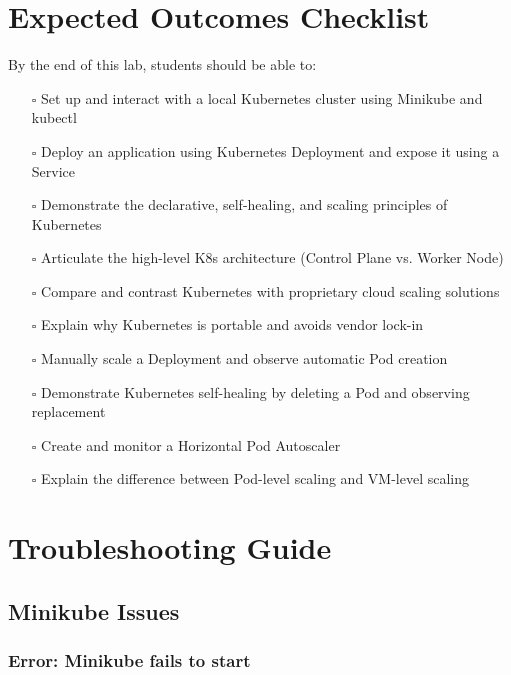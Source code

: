 \documentclass[12pt,a4paper]{article}
\begin{document}
\section{Expected Outcomes Checklist}

By the end of this lab, students should be able to:

\begin{itemize}
    \item[$\square$] Set up and interact with a local Kubernetes cluster using Minikube and kubectl
    \item[$\square$] Deploy an application using Kubernetes Deployment and expose it using a Service
    \item[$\square$] Demonstrate the declarative, self-healing, and scaling principles of Kubernetes
    \item[$\square$] Articulate the high-level K8s architecture (Control Plane vs. Worker Node)
    \item[$\square$] Compare and contrast Kubernetes with proprietary cloud scaling solutions
    \item[$\square$] Explain why Kubernetes is portable and avoids vendor lock-in
    \item[$\square$] Manually scale a Deployment and observe automatic Pod creation
    \item[$\square$] Demonstrate Kubernetes self-healing by deleting a Pod and observing replacement
    \item[$\square$] Create and monitor a Horizontal Pod Autoscaler
    \item[$\square$] Explain the difference between Pod-level scaling and VM-level scaling
\end{itemize}

\newpage

\appendix

\section{Troubleshooting Guide}

\subsection{Minikube Issues}

\subsubsection{Error: Minikube fails to start}
\end{document}
